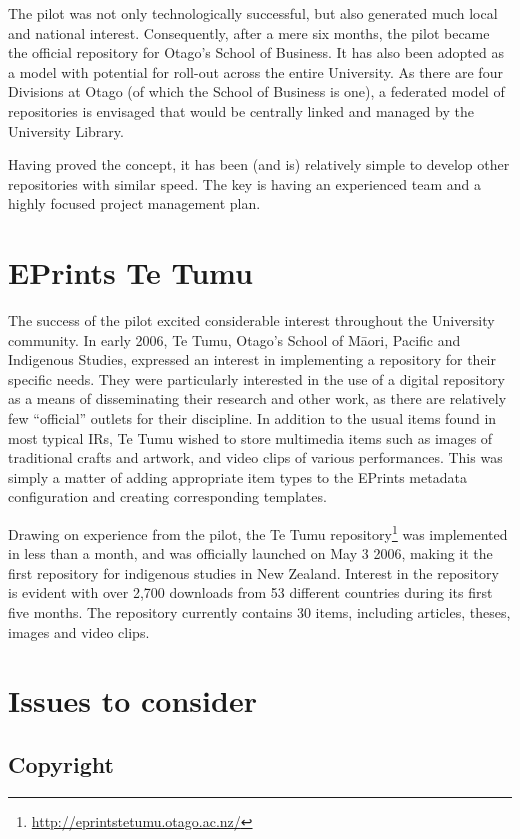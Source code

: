 \documentclass[12pt,pdftex,a4paper,titlepage]{article}
\begin{document}
The pilot was not only technologically successful, but also generated much local and national interest. Consequently, after a mere six months, the pilot became the official repository for Otago's School of Business. It has also been adopted as a model with potential for roll-out across the entire University. As there are four Divisions at Otago (of which the School of Business is one), a federated model of repositories is envisaged that would be centrally linked and managed by the University Library.

Having proved the concept, it has been (and is) relatively simple to develop other repositories with similar speed. The key is having an experienced team and a highly focused project management plan. 


\section{EPrints Te Tumu}

The success of the pilot excited considerable interest throughout the University community. In early 2006, Te Tumu, Otago's School of M\={a}ori, Pacific and Indigenous Studies, expressed an interest in implementing a repository for their specific needs. They were particularly interested in the use of a digital repository as a means of disseminating their research and other work, as there are relatively few ``official'' outlets for their discipline. In addition to the usual items found in most typical IRs, Te Tumu wished to store multimedia items such as images of traditional crafts and artwork, and video clips of various performances. This was simply a matter of adding appropriate item types to the EPrints metadata configuration and creating corresponding templates.

Drawing on experience from the pilot, the Te Tumu repository\footnote{\url{http://eprintstetumu.otago.ac.nz/}} was implemented in less than a month, and was officially launched on May 3 2006, making it the first repository for indigenous studies in New Zealand. Interest in the repository is evident  with over 2,700 downloads from 53 different countries during its first five months. The repository currently contains 30 items, including articles, theses, images and video clips.


\section{Issues to consider}


\subsection{Copyright}
\end{document}
